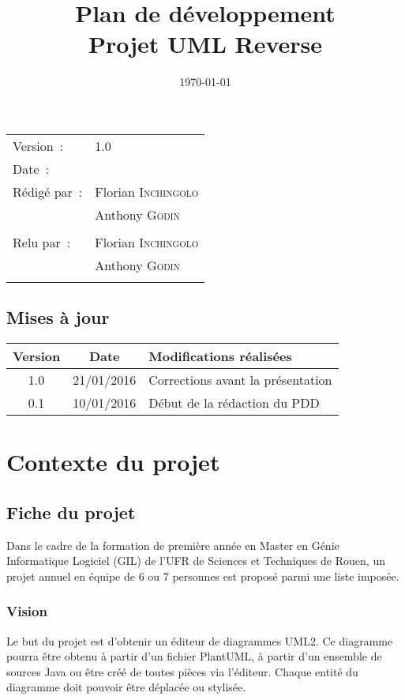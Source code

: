 \documentclass[hidelinks, 10pt,a4paper]{article}
\title{\bfseries Plan de développement\\Projet UML Reverse}
\begin{document}
\maketitle
\begin{center}
\begin{tabular}{ll}
  Version~: & 1.0\\[.5em]
  Date~: & \date{\today}\\[.5em]
  Rédigé par~: & Florian \textsc{Inchingolo}\\
               & Anthony \textsc{Godin}\\
               &\\[.5em]
  Relu par~:   & Florian \textsc{Inchingolo}\\
               & Anthony \textsc{Godin}\\
               &\\
\end{tabular}
\end{center}

\newpage
\begin{center}
    \section*{Mises à jour}
    \begin{tabular}{|c|c|p{8cm}|}
        \hline{\textbf{Version}} & {\textbf{Date}} & {\textbf{Modifications réalisées}}\\\hline
        {1.0} & {21/01/2016} & {Corrections avant la présentation}\\\hline
        {0.1} & {10/01/2016} & {Début de la rédaction du PDD}\\\hline
    \end{tabular}
\end{center}

\newpage
\tableofcontents

\newpage
\section{Contexte du projet}
\subsection{Fiche du projet}
Dans le cadre de la formation de première année en Master en Génie Informatique Logiciel (GIL)
de l'UFR de Sciences et Techniques de Rouen, un projet annuel en équipe de 6 ou 7 personnes
est proposé parmi une liste imposée.

\subsubsection*{Vision}
Le but du projet est d'obtenir un éditeur de diagrammes UML2. Ce diagramme pourra
être obtenu à partir d'un fichier PlantUML, à partir d'un ensemble de sources Java
ou être créé de toutes pièces via l'éditeur. Chaque entité du diagramme doit pouvoir
être déplacée ou stylisée.
\end{document}
